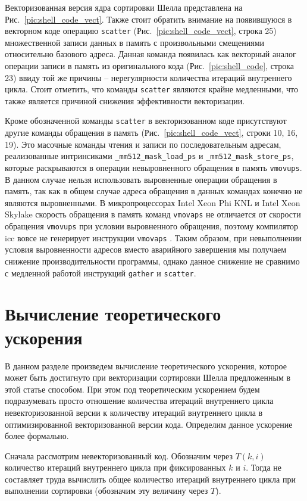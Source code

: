 \documentclass[utf8]{psta}
\begin{document}
Векторизованная версия ядра сортировки Шелла представлена на Рис.~\ref{pic:shell_code_vect}. 
Также стоит обратить внимание на появившуюся в векторном коде операцию \texttt{scatter} (Рис.~\ref{pic:shell_code_vect}, строка 25) множественной записи данных в память с произвольными смещениями относительно базового адреса.
Данная команда появилась как векторный аналог операции записи в память из оригинального кода (Рис.~\ref{pic:shell_code}, строка 23) ввиду той же причины -- нерегулярности количества итераций внутреннего цикла. 
Стоит отметить, что команды \texttt{scatter} являются крайне медленными, что также является причиной снижения эффективности векторизации.

Кроме обозначенной команды \texttt{scatter} в векторизованном коде присутствуют другие команды обращения в память (Рис.~\ref{pic:shell_code_vect}, строки 10, 16, 19). 
Это масочные команды чтения и записи по последовательным адресам, реализованные интринсиками \texttt{\_mm512\_mask\_load\_ps} и \texttt{\_mm512\_mask\_store\_ps}, которые раскрываются в операции невыровненного обращения в память \texttt{vmovups}.
В данном случае нельзя использовать выровненные операции обращения в память, так как в общем случае адреса обращения в данных командах конечно не являются выровненными.
В микропроцессорах Intel Xeon Phi KNL и Intel Xeon Skylake скорость обращения в память команд \texttt{vmovaps} не отличается от скорости обращения \texttt{vmovups} при условии выровненного обращения, поэтому компилятор icc вовсе не генерирует инструкции \texttt{vmovaps} \cite{IntelVMOVUPS}.
Таким образом, при невыполнении условия выровненности адресов вместо аварийного завершения мы получаем снижение производительности программы, однако данное снижение не сравнимо с медленной работой инструкций \texttt{gather} и \texttt{scatter}.

\section{Вычисление теоретического ускорения}

В данном разделе произведем вычисление теоретического ускорения, которое может быть достигнуто при векторизации сортировки Шелла предложенным в этой статье способом. 
При этом под теоретическим ускорением будем подразумевать просто отношение количества итераций внутреннего цикла невекторизованной версии к количеству итераций внутреннего цикла в оптимизированной векторизованной версии кода. Определим данное ускорение более формально.

Сначала рассмотрим невекторизованный код. Обозначим через $T(k, i)$ количество итераций внутреннего цикла при фиксированных $k$ и $i$. 
Тогда не составляет труда вычислить общее количество итераций внутреннего цикла при выполнении сортировки (обозначим эту величину через $T$).
\end{document}
